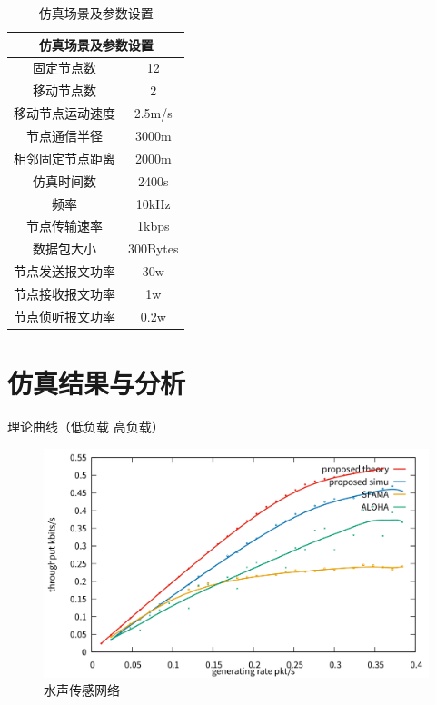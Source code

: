 \begin{table}[!htp]
	\centering
\caption{仿真场景及参数设置}
\begin{tabular}{|c|c|}%
	\hline  %
	\multicolumn{2}{|c|}{仿真场景及参数设置}\\
	\hline  %
	固定节点数& 12\\
	\hline
	移动节点数& 2\\
	\hline
	移动节点运动速度& 2.5m/s\\
	\hline
	节点通信半径& 3000m\\
	\hline
	相邻固定节点距离& 2000m\\
	\hline
	仿真时间数& 2400s\\
	\hline
	频率& 10kHz\\
	\hline				
	节点传输速率& 1kbps\\
	\hline
	数据包大小& 300Bytes\\
	\hline
	节点发送报文功率& 30w\\
	\hline				
	节点接收报文功率& 1w\\
	\hline
	节点侦听报文功率& 0.2w\\	
	\hline	
\end{tabular}
\label{tab2}
\end{table}

\section {仿真结果与分析}
理论曲线（低负载 高负载）
\begin{figure}[ht]
	\centering
	\includegraphics[scale=0.1]{figures/555.png}
	\caption{
		水声传感网络
	}
	\label{fig:example}
\end{figure}

